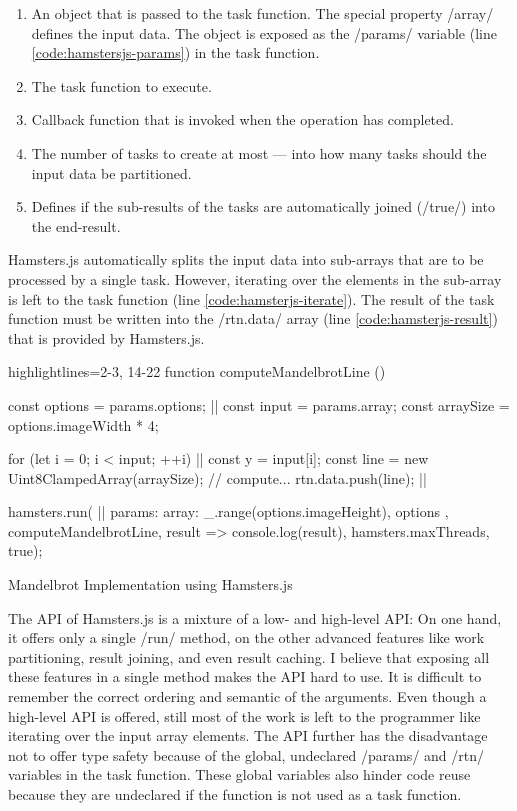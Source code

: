 \begin{enumerate}
	\item An object that is passed to the task function. The special property \javascriptinline/array/ defines the input data. The object is exposed as the \javascriptinline/params/ variable (line \ref{code:hamstersjs-params}) in the task function.
	\item The task function to execute.
	\item Callback function that is invoked when the operation has completed.
	\item The number of tasks to create at most --- into how many tasks should the input data be partitioned. 
	\item Defines if the sub-results of the tasks are automatically joined (\javascriptinline/true/) into the end-result.
\end{enumerate}

Hamsters.js automatically splits the input data into sub-arrays that are to be processed by a single task. However, iterating over the elements in the sub-array is left to the task function (line \ref{code:hamsterjs-iterate}). The result of the task function must be written into the \javascriptinline/rtn.data/ array (line \ref{code:hamsterjs-result}) that is provided by Hamsters.js. 

\begin{listing}
\begin{javascriptcode*}{highlightlines={2-3, 14-22}}
function computeMandelbrotLine () {
	const options = params.options; |$\label{code:hamstersjs-params}$|
	const input = params.array;
	const arraySize = options.imageWidth * 4;

	for (let i = 0; i < input; ++i) {|$\label{code:hamsterjs-iterate}$|
		const y = input[i];
		const line = new Uint8ClampedArray(arraySize);
		// compute...
		rtn.data.push(line); |$\label{code:hamsterjs-result}$|
	}
}

hamsters.run( |$\label{code:hamsterjs-start}$|
	params: {
		array: _.range(options.imageHeight),
		options
	},  
	computeMandelbrotLine, 
	result => console.log(result), 
	hamsters.maxThreads, 
	true);
\end{javascriptcode*}
\caption{Mandelbrot Implementation using Hamsters.js}
\label{fig:mandelbrot-hamsterjs}
\end{listing}

The API of Hamsters.js is a mixture of a low- and high-level API: On one hand, it offers only a single \javascriptinline/run/ method, on the other advanced features like work partitioning, result joining, and even result caching. I believe that exposing all these features in a single method makes the API hard to use. It is difficult to remember the correct ordering and semantic of the arguments. Even though a high-level API is offered, still most of the work is left to the programmer like iterating over the input array elements. The API further has the disadvantage not to offer type safety because of the global, undeclared \javascriptinline/params/ and \javascriptinline/rtn/ variables in the task function. These global variables also hinder code reuse because they are undeclared if the function is not used as a task function. 

